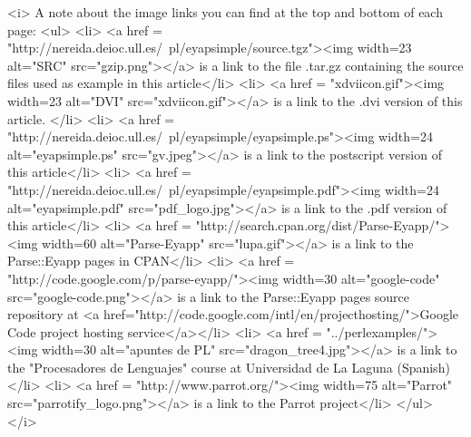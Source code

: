 \begin{rawhtml}
<i>
A note about the image links you can find  at the top and bottom of each page:
<ul>
<li>
<a href = "http://nereida.deioc.ull.es/~pl/eyapsimple/source.tgz"><img width=23 alt="SRC" src="gzip.png"></a>  is a link to the file .tar.gz 
containing the source files used as example in this article</li>
<li>
<a href = "xdviicon.gif"><img width=23 alt="DVI" src="xdviicon.gif"></a>  is a link to the .dvi version of this article. 
</li>
<li>
<a href = "http://nereida.deioc.ull.es/~pl/eyapsimple/eyapsimple.ps"><img width=24 alt="eyapsimple.ps" src="gv.jpeg"></a> is
a link to the postscript version of this article</li>
<li>
<a href = "http://nereida.deioc.ull.es/~pl/eyapsimple/eyapsimple.pdf"><img width=24 alt="eyapsimple.pdf" src="pdf_logo.jpg"></a> is a link to the .pdf version of this article</li>
<li>
<a href = "http://search.cpan.org/dist/Parse-Eyapp/"><img width=60 alt="Parse-Eyapp" src="lupa.gif"></a> is a link to the Parse::Eyapp 
pages in CPAN</li>
<li>
<a href = "http://code.google.com/p/parse-eyapp/"><img width=30 alt="google-code" src="google-code.png"></a> is a link to the Parse::Eyapp 
pages source repository at <a href="http://code.google.com/intl/en/projecthosting/">Google Code project hosting service</a></li>
<li>
<a href = "../perlexamples/"><img width=30 alt="apuntes de PL" src="dragon_tree4.jpg"></a> is a link to the "Procesadores de Lenguajes"
course at Universidad de La Laguna (Spanish)</li>
<li>
<a href = "http://www.parrot.org/"><img width=75 alt="Parrot" src="parrotify_logo.png"></a> is a link to the Parrot project</li>
</ul>
</i>
\end{rawhtml}
